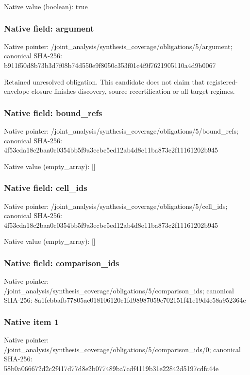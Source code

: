 \documentclass[10pt,a4paper]{article}
\begin{document}
Native value (boolean): true

\subsubsection{Native field: argument}
Native pointer: /joint\_\allowbreak{}analysis/synthesis\_\allowbreak{}coverage/obligations/5/argument; canonical SHA-256: b911f50d8b73b3d7f08b74d550e9f8050c353f01c4f9f7621905110a4d9b0067

\begingroup\raggedright\sloppy Retained unresolved obligation. This candidate does not claim that registered-envelope closure finishes discovery,\allowbreak{} source recertification or all target regimes.\par\endgroup

\subsubsection{Native field: bound\_\allowbreak{}refs}
Native pointer: /joint\_\allowbreak{}analysis/synthesis\_\allowbreak{}coverage/obligations/5/bound\_\allowbreak{}refs; canonical SHA-256: 4f53cda18c2baa0c0354bb5f9a3ecbe5ed12ab4d8e11ba873c2f11161202b945

Native value (empty\_\allowbreak{}array): []

\subsubsection{Native field: cell\_\allowbreak{}ids}
Native pointer: /joint\_\allowbreak{}analysis/synthesis\_\allowbreak{}coverage/obligations/5/cell\_\allowbreak{}ids; canonical SHA-256: 4f53cda18c2baa0c0354bb5f9a3ecbe5ed12ab4d8e11ba873c2f11161202b945

Native value (empty\_\allowbreak{}array): []

\subsubsection{Native field: comparison\_\allowbreak{}ids}
Native pointer: /joint\_\allowbreak{}analysis/synthesis\_\allowbreak{}coverage/obligations/5/comparison\_\allowbreak{}ids; canonical SHA-256: 8a1fcbbafb77805ac018106120c1fd98987059c702151f41e19d4e58a952364c

\subsubsection{Native item 1}
Native pointer: /joint\_\allowbreak{}analysis/synthesis\_\allowbreak{}coverage/obligations/5/comparison\_\allowbreak{}ids/0; canonical SHA-256: 58b0a066672d2c2f417d77d8e2b077489ba7cdf4119b31e22842d5197cdfc44e
\end{document}

